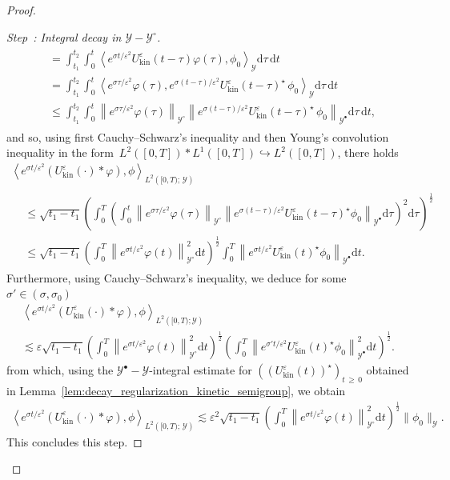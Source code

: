 \documentclass[AHL,Unicode,longabstracts,published]{cedram}
\newcommand{\kin}{\mathrm{kin}}
\renewcommand{\d}{\mathrm{d}}
\newcommand{\VV}{\mathcal{Y}}
\newcommand{\SSg}{\VV}
\newcommand{\SSgp}{\VV^{\bullet}}
\newcommand{\SSgm}{\VV^{\circ}}
\renewcommand*\le{\leqslant}
\renewcommand*\geq{\geqslant}
\newcommand*\eps{{\varepsilon}}
\newcommand{\la}{\langle}
\newcommand{\ra}{\rangle}
\newcommand{\lla}{\left\langle}
\newcommand{\rra}{\right\rangle}
\newcounter{stepcount}
\newenvironment{step}[1]{\refstepcounter{stepcount}\begin{proof}[Step~\thestepcount: #1]}{\let\qed\relax\end{proof}}
\begin{document}
\begin{proof}
\begin{step}{{Integral decay in $\SSg-\SSgm$}}
\begin{multline*}
\begin{aligned}
& = \int_{t_1}^{t_2} \int_0^t \lla e^{\sigma t / \eps^2} U^\eps_\kin(t-\tau) \varphi(\tau), \phi_0 \rra_{\SSg} \d \tau \, \d t \\
& = \int_{t_1}^{t_2} \int_0^t \lla e^{\sigma \tau / \eps^2} \varphi(\tau), e^{\sigma (t-\tau) / \eps^2 } U^\eps_\kin(t-\tau)^\star \, \phi_0 \rra_{\SSg} \d \tau \, \d t \\
& \le \int_{t_1}^{t_2} \int_0^t \left\| e^{\sigma \tau / \eps^2 } \varphi(\tau) \right\|_{\SSgm } \left\| e^{\sigma (t-\tau) / \eps^2 } U^\eps_\kin(t-\tau)^\star \, \phi_0 \right\|_{\SSgp} \d \tau \, \d t,
\end{aligned}
\end{multline*}
and so, using first Cauchy--Schwarz's inequality and then Young's convolution inequality in the form~$L^2([0, T] ) \ast L^1([0, T]) \hookrightarrow L^2([0, T])$, there holds
\begin{multline*}
\left\la e^{\sigma t / \eps^2}  (U^\eps_\kin(\cdot) * \varphi), \phi \right\ra_{ L^2\left([0, T) ;\,\SSg \right) } \\
\begin{aligned}
& \le \sqrt{t_1-t_1} \left(\int_{0}^{T} \left(\int_0^t \left\| e^{\sigma \tau / \eps^2} \varphi(\tau) \right\|_{\SSgm } \left\| e^{\sigma (t-\tau) / \eps^2 } U^\eps_\kin(t-\tau)^\star \phi_0 \right\|_{\SSgp} \d \tau \right)^2 \d \tau \right)^{\frac{1}{2}} \\
& \le \sqrt{t_1-t_1} \left(\int_0^T \left\| e^{\sigma t / \eps^2 } \varphi(t) \right\|_{\SSgm }^2 \d t\right)^{\frac{1}{2}} \int_0^T \left\| e^{\sigma t / \eps^2 } U^\eps_\kin(t)^\star \phi_0 \right\|_{\SSgp} \d t.
\end{aligned}
\end{multline*}
Furthermore, using Cauchy--Schwarz's inequality, we deduce for some $\sigma' \in (\sigma, \sigma_0)$
\begin{multline*}
\lla e^{\sigma t / \eps^2}  (U^\eps_\kin(\cdot) * \varphi), \phi \rra_{ L^2\left([0, T) ; \SSg \right) } \\
 \lesssim \eps \sqrt{t_1-t_1} \left(\int_0^T \left\| e^{\sigma t / \eps^2 } \varphi(t) \right\|_{\SSgm }^2 \d t\right)^{\frac{1}{2}} \left(\int_0^T \left\| e^{\sigma' t / \eps^2 } U^\eps_\kin(t)^\star \phi_0 \right\|_{\SSgp}^2 \d t\right)^{\frac{1}{2}}.
\end{multline*}
from which, using the $\SSgp-\SSg$-integral estimate for $((U^\eps_\kin(t))^\star)_{t\,\geq\,0}$ obtained in Lemma~\ref{lem:decay_regularization_kinetic_semigroup}, we obtain
\begin{align*}
\lla e^{\sigma t / \eps^2} (U^\eps_\kin(\cdot) * \varphi), \phi \rra_{ L^2\left([0, T) ;\,\SSg \right) }
 \lesssim \eps^2 \sqrt{t_1-t_1} \left(\int_0^T \left\| e^{\sigma t / \eps^2 } \varphi(t) \right\|_{\SSgm }^2 \d t\right)^{\frac{1}{2}} \| \phi_0 \|_{\SSg}.
\end{align*}
This concludes this step.
\end{step}


\end{proof}
\end{document}
